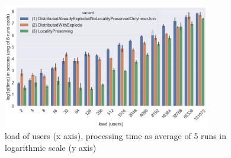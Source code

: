 \documentclass[conference]{IEEEtran}
\begin{document}
%

\begin{figure}
    \centering
    \includegraphics[height=55mm]{img/log_plot.png}
    \caption{load of users (x axis), processing time as average of 5 runs in logarithmic scale (y axis)}
    \label{fig:results}

\end{figure}
\end{document}
